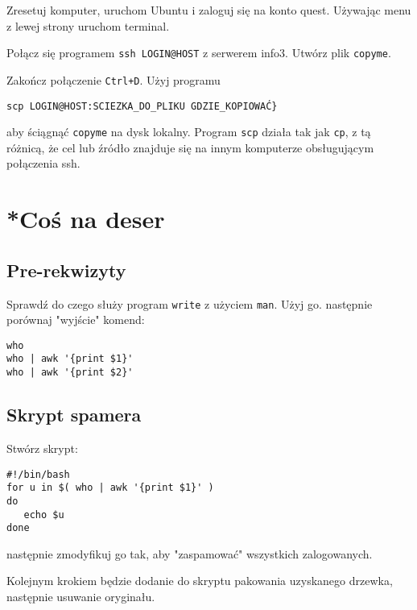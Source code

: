 \documentclass{instrukcja}
\begin{document}
Zresetuj komputer, uruchom Ubuntu i zaloguj się na konto quest. Używając menu z lewej strony uruchom terminal.

Połącz się programem {\tt ssh LOGIN@HOST} z serwerem info3. Utwórz plik {\tt copyme}.

Zakończ połączenie {\tt Ctrl+D}. Użyj programu 

\begin{verbatim}
scp LOGIN@HOST:SCIEZKA_DO_PLIKU GDZIE_KOPIOWAĆ} 
\end{verbatim}

aby ściągnąć {\tt copyme} na dysk lokalny. Program {\tt scp} działa tak jak {\tt cp}, z tą różnicą, że cel lub źródło znajduje się na innym komputerze obsługującym połączenia ssh.

\section{*Coś na deser}

\subsection{Pre-rekwizyty}
Sprawdź do czego służy program {\tt write} z użyciem {\tt man}. Użyj go. następnie porównaj "wyjście" komend: 
\begin{verbatim}
who
who | awk '{print $1}'
who | awk '{print $2}'
\end{verbatim}

\subsection{Skrypt spamera}

Stwórz skrypt:
\begin{verbatim}
#!/bin/bash
for u in $( who | awk '{print $1}' )
do
   echo $u
done
\end{verbatim}

następnie zmodyfikuj go tak, aby "zaspamować" wszystkich zalogowanych.

Kolejnym krokiem będzie dodanie do skryptu pakowania uzyskanego drzewka, następnie usuwanie oryginału.
\end{document}
